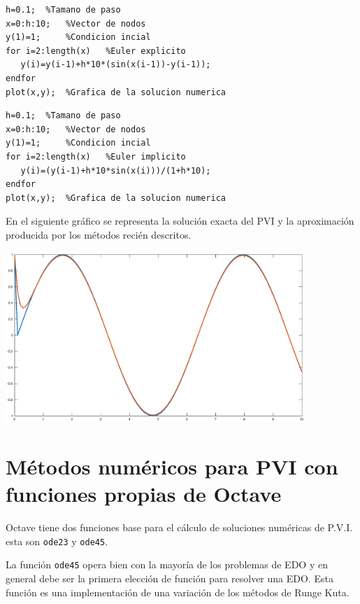 \documentclass[letter,11pt]{article}
\newcommand{\octave}{{\sc Octave} }
\begin{document}
\vspace{5mm}
\hspace{-0.1\textwidth}
\begin{minipage}{0.55\textwidth}
\begin{lstlisting}
h=0.1;  %Tamano de paso
x=0:h:10;   %Vector de nodos
y(1)=1;     %Condicion incial
for i=2:length(x)   %Euler explicito
   y(i)=y(i-1)+h*10*(sin(x(i-1))-y(i-1));
endfor
plot(x,y);  %Grafica de la solucion numerica
\end{lstlisting}
\end{minipage}
\hspace{5mm}
\begin{minipage}{0.55\textwidth}
\begin{lstlisting}
h=0.1;  %Tamano de paso
x=0:h:10;   %Vector de nodos
y(1)=1;     %Condicion incial
for i=2:length(x)   %Euler implicito
   y(i)=(y(i-1)+h*10*sin(x(i)))/(1+h*10);
endfor
plot(x,y);  %Grafica de la solucion numerica
\end{lstlisting}
\end{minipage}
En el siguiente gr\'afico se representa la soluci\'on exacta del PVI y la aproximaci\'on producida por los m\'etodos reci\'en descritos.
\begin{center}
\includegraphics[width=0.85\textwidth]{./euler.eps}
\end{center}

\section{M\'etodos num\'ericos para PVI con funciones propias de \octave}

\octave tiene dos funciones base para el c\'alculo de soluciones num\'ericas de P.V.I. esta son \texttt{ode23} y \texttt{ode45}.

La funci\'on \texttt{ode45} opera bien con la mayor\'ia de los problemas de EDO y en general debe ser la primera elecci\'on de funci\'on para resolver una EDO. Esta funci\'on es una implementaci\'on de una variaci\'on de los m\'etodos de Runge Kuta.
\end{document}
